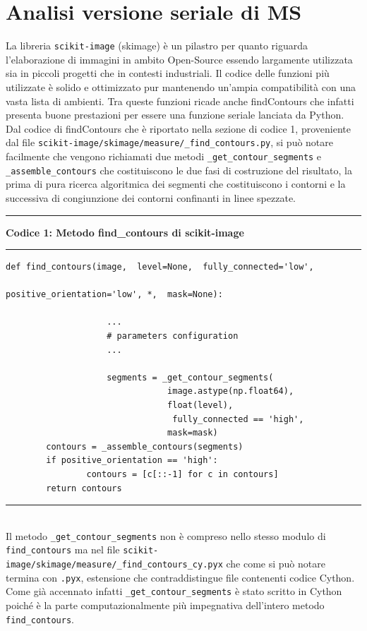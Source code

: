 \documentclass[12pt,a4paper]{report}
\begin{document}
\section{Analisi versione seriale di MS}
La libreria \verb|scikit-image| (skimage) è un pilastro per quanto riguarda l'elaborazione di immagini in ambito Open-Source essendo largamente utilizzata sia in piccoli progetti che in contesti industriali.  Il codice delle funzioni più utilizzate è solido e ottimizzato pur mantenendo un'ampia compatibilità con una vasta lista di ambienti. 
Tra queste funzioni ricade anche findContours che infatti presenta buone prestazioni per essere una funzione seriale lanciata da Python.\newline
Dal codice di findContours che è riportato nella sezione di codice 1, proveniente dal file \verb|scikit-image/skimage/measure/_find_contours.py|, si può notare facilmente che vengono richiamati due metodi \verb|_get_contour_segments| e \verb|_assemble_contours| che costituiscono le due fasi di costruzione del risultato, la prima di pura ricerca algoritmica dei segmenti che costituiscono i contorni e la successiva di congiunzione dei contorni confinanti in linee spezzate. \\[10pt]
\noindent\rule[0.5ex]{\linewidth}{2pt}
\small{\textbf{Codice 1: Metodo find\_contours di scikit-image}} \\
\noindent\rule[0.5ex]{\linewidth}{1pt}
\begin{lstlisting}
def find_contours(image,  level=None,  fully_connected='low', 
																		positive_orientation='low', *,  mask=None):

					...
					# parameters configuration
					...	

					segments = _get_contour_segments(
					 			image.astype(np.float64), 
					 			float(level),
								 fully_connected == 'high', 
					 			mask=mask)
    	contours = _assemble_contours(segments)
    	if positive_orientation == 'high':
        		contours = [c[::-1] for c in contours]
    	return contours
\end{lstlisting}
\noindent\rule[0.5ex]{\linewidth}{1pt} \\[10pt]
Il metodo \verb|_get_contour_segments| non è compreso nello stesso modulo di  \verb|find_contours| ma nel file \verb|scikit-image/skimage/measure/_find_contours_cy.pyx| che come si può notare termina con \verb|.pyx|, estensione che contraddistingue file contenenti codice Cython.  Come già accennato infatti \verb|_get_contour_segments| è stato scritto in Cython poiché è la parte computazionalmente più impegnativa dell'intero metodo \verb|find_contours|.  \newline
\end{document}
